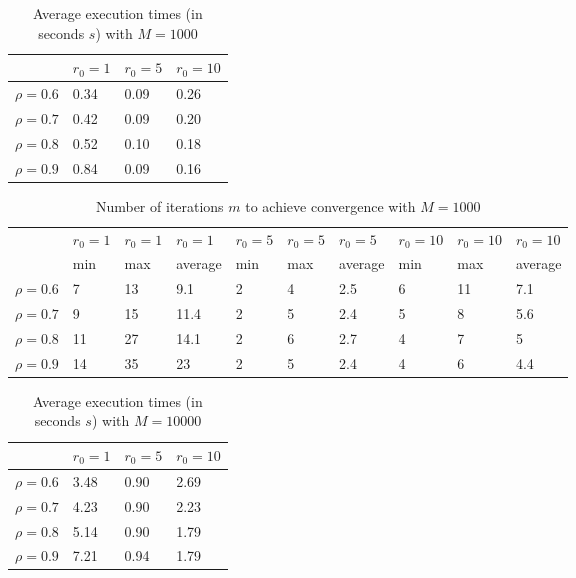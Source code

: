 \documentclass[a4paper,11pt,openright]{report}
\begin{document}
\begin{table}[H]
\centering
\addtolength{\leftskip}{-1.5cm}
\addtolength{\rightskip}{-1.5cm}
\begin{tabular}{|c|lll|}
\hline
$ $ & $r_0 = 1$ & $r_0 = 5$ & $r_0 = 10$ \\
\hline
$\rho = 0.6$ & 0.34 & 0.09 & 0.26 \\

$\rho = 0.7$ & 0.42 & 0.09 & 0.20 \\

$\rho = 0.8$ & 0.52 & 0.10 & 0.18 \\

$\rho = 0.9$ & 0.84 & 0.09 & 0.16 \\
\hline
\end{tabular}
\caption{Average execution
 times (in seconds $s$) with $M = 1000$}
\end{table}
\begin{table}[H]
\centering
\addtolength{\leftskip}{-1.5cm}
\addtolength{\rightskip}{-1.5cm}
\begin{tabular}{|c|lllllllll|}
\hline
$ $ & $r_0 = 1$ & $r_0 = 1$ & $r_0 = 1$ & $r_0 = 5$ & $r_0 = 5$ & $r_0 = 5$ & $r_0 = 10$ & $r_0 = 10$ & $r_0 = 10$  \\
$ $ & min & max & average & min & max & average & min & max & average \\ 
\hline
$\rho = 0.6$ & 7 & 13 & 9.1 & 2 & 4 & 2.5 & 6 & 11 & 7.1\\

$\rho = 0.7$ & 9 & 15 & 11.4 & 2 & 5 & 2.4 & 5 & 8 & 5.6\\

$\rho = 0.8$ & 11 & 27 & 14.1 & 2 & 6 & 2.7 & 4 & 7 & 5\\

$\rho = 0.9$ & 14 & 35 & 23 & 2 & 5 & 2.4 & 4 & 6 & 4.4\\
\hline
\end{tabular}
\caption{Number of iterations $m$ to achieve convergence with $M = 1000$}
\end{table}
\begin{table}[H]
\centering
\addtolength{\leftskip}{-1.5cm}
\addtolength{\rightskip}{-1.5cm}
\begin{tabular}{|c|lll|}
\hline
$ $ & $r_0 = 1$ & $r_0 = 5$ & $r_0 = 10$ \\
\hline
$\rho = 0.6$ & 3.48 & 0.90 & 2.69 \\

$\rho = 0.7$ & 4.23 & 0.90 & 2.23 \\

$\rho = 0.8$ & 5.14 & 0.90 & 1.79 \\

$\rho = 0.9$ & 7.21 & 0.94 & 1.79 \\
\hline
\end{tabular}
\caption{Average execution
 times (in seconds $s$) with $M = 10000$}
\end{table}
\end{document}
